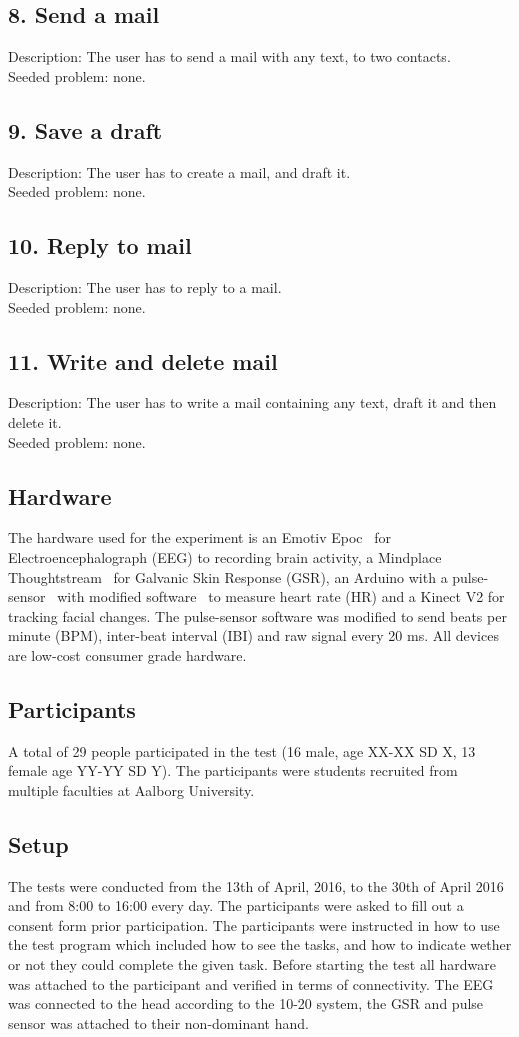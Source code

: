 \subsection*{8. Send a mail}
Description: The user has to send a mail with any text, to two contacts.\\
Seeded problem: none.
\subsection*{9. Save a draft}
Description: The user has to create a mail, and draft it.\\
Seeded problem: none.
\subsection*{10. Reply to mail}
Description: The user has to reply to a mail.\\
Seeded problem: none.
\subsection*{11. Write and delete mail}
Description: The user has to write a mail containing any text, draft it and then delete it.\\
Seeded problem: none.
\subsection{Hardware}
The hardware used for the experiment is an Emotiv Epoc~\cite{emotiv_epoc_website} for Electroencephalograph (EEG) to recording brain activity, a Mindplace Thoughtstream~\cite{thoughtstream} for Galvanic Skin Response (GSR), an Arduino with a pulse-sensor~\cite{pulsesensor} with modified software~\cite{pulsesensorgit} to measure heart rate (HR) and a Kinect V2\cite{kinect_specs3} for tracking facial changes.
The pulse-sensor software was modified to send beats per minute (BPM), inter-beat interval (IBI) and raw signal every 20 ms.
All devices are low-cost consumer grade hardware.

\subsection{Participants}
A total of 29 people participated in the test (16 male, age XX-XX SD X, 13 female age YY-YY SD Y).
The participants were students recruited from multiple faculties at Aalborg University.

\subsection{Setup}
The tests were conducted from the 13th of April, 2016, to the 30th of April 2016 and from 8:00 to 16:00 every day. 
The participants were asked to fill out a consent form prior participation. 
The participants were instructed in how to use the test program which included how to see the tasks, and how to indicate wether or not they could complete the given task. 
Before starting the test all hardware was attached to the participant and verified in terms of connectivity. 
The EEG was connected to the head according to the 10-20 system\cite{eeg_tech_10_20}, the GSR and pulse sensor was attached to their non-dominant hand. 

